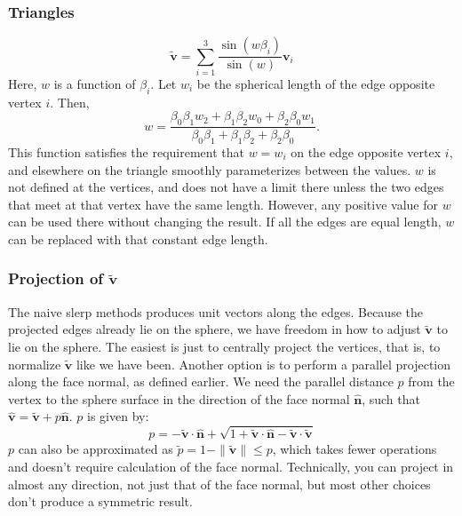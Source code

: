 \documentclass{amsart}[12pt]
\begin{document}
\subsubsection{Triangles}
\begin{equation}\label{eq:nst}
   \widetilde{\mathbf v} = \sum_{i=1}^3\frac{\sin(w\beta_i)}{\sin(w)}  \mathbf v_i
\end{equation}
Here, $w$ is a function of $\beta_i$. Let $w_i$ be the spherical length of the edge opposite vertex $i$. Then,
\begin{equation}
  w = \frac{\beta_0 \beta_1 w_2 + \beta_1 \beta_2 w_0 + \beta_2 \beta_0 w_1}
      {\beta_0 \beta_1 + \beta_1 \beta_2 + \beta_2 \beta_0}.
\end{equation}
This function satisfies the requirement that $w = w_i$ on the edge opposite
vertex $i$, and elsewhere on the triangle smoothly parameterizes between the
values. $w$ is not defined at the vertices, and does not have a limit there
unless the two edges that meet at that vertex have the same length. However,
any positive value for $w$ can be used there without changing the result.
If all the edges are equal length,
$w$ can be replaced with that constant edge length.

\subsubsection{Projection of $\widetilde{\mathbf v}$}
The naive slerp methods produces unit vectors along the edges. Because the
projected edges already lie on the sphere, we have freedom in how to adjust
$\widetilde{\mathbf v}$ to lie on the sphere. The easiest is just to centrally
project the vertices, that is, to normalize $\widetilde{\mathbf v}$ like we
have been. Another option is to perform a parallel projection along the
face normal, as defined earlier. We need the parallel distance $p$ from the
vertex to the sphere surface in the direction of the face normal
$\hat{\mathbf n}$, such that $\hat{\mathbf v} =
\widetilde{\mathbf v} + p\hat{\mathbf n}$. $p$ is given by:
\begin{equation}
   p = -\widetilde{\mathbf v} \cdot \hat{\mathbf n} +
   \sqrt{1+\widetilde{\mathbf v} \cdot \hat{\mathbf n}-\widetilde{\mathbf v} \cdot \widetilde{\mathbf v}}
\end{equation}
$p$ can also be approximated as $\widetilde{p} = 1 - \|\widetilde{\mathbf v}\|
\leq p$, which takes fewer operations and doesn't require
calculation of the face normal. Technically, you can project in almost any
direction, not just that of the face normal, but most other choices don't
produce a symmetric result.
\end{document}
